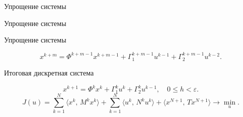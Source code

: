         \begin{frame}[t]{Упрощение системы}
                \centering
                
        \end{frame}
        \begin{frame}[t]{Упрощение системы}
                \centering
                
        \end{frame}
        \begin{frame}[t]{Упрощение системы}
                \centering
                

                \vspace{0.3cm}

                \begin{equation*}
                        x^{k+m}
                        =
                        \Phi^{k+m-1} x^{k+m-1} + \Gamma_1^{k+m-1}u^{k-1} + \Gamma_2^{k+m-1}u^{k-2}.
                \end{equation*}
        \end{frame}
        \begin{frame}[t]{Итоговая дискретная система}
                \centering
                
                \begin{equation*}
                        x^{k+1}
                        =
                        \Phi^k x^k + \Gamma_1^k u^{k} + \Gamma_2^k u^{k-1},
                        \quad
                        0 \leqslant h < \varepsilon.
                \end{equation*}
                \begin{equation*}
                        J(u)
                        =
                        \sum_{k=1}^{N}\langle x^k,\,M^k x^k \rangle
                        +
                        \sum_{k=1}^{N}\langle u^k,\,N^k u^k \rangle
                        +
                        \langle x^{N+1},\,T x^{N+1} \rangle
                        \longrightarrow \min\limits_{u}.
                \end{equation*}
        \end{frame}
